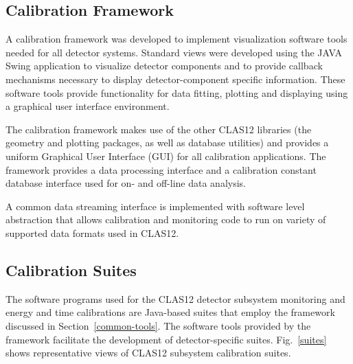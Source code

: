 \documentclass[3p,times,twocolumn]{elsarticle}
\begin{document}
\subsection{Calibration Framework}

A calibration framework was developed to implement visualization software tools needed for all detector
systems. Standard views were developed using the JAVA Swing application to visualize detector components and to provide callback
mechanisms necessary to display detector-component specific information.  These software tools provide
functionality for data fitting, plotting and displaying using a graphical user interface environment.

The calibration framework makes use of the other CLAS12 libraries
(the geometry and plotting packages, as well as database utilities) and provides a uniform Graphical User
Interface (GUI) for all calibration applications. The framework provides a data processing interface
and a calibration constant database interface used
for on- and off-line data analysis.

A common data streaming interface is implemented with software level abstraction that allows calibration and monitoring
code to run on variety of supported data formats used in CLAS12.

\subsection{Calibration Suites}

The software programs used for the CLAS12 detector subsystem monitoring and energy and time calibrations are
Java-based suites that employ the framework discussed in Section~\ref{common-tools}.
The software tools provided by the framework facilitate the development of
detector-specific suites. Fig.~\ref{suites} shows representative views of CLAS12 subsystem calibration suites.
\end{document}
